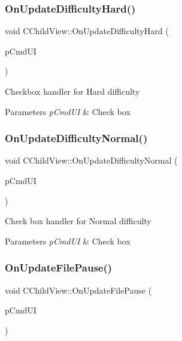 \subsubsection{\texorpdfstring{OnUpdateDifficultyHard()}{OnUpdateDifficultyHard()}}
{\footnotesize\ttfamily void C\+Child\+View\+::\+On\+Update\+Difficulty\+Hard (\begin{DoxyParamCaption}\item[{C\+Cmd\+UI $\ast$}]{p\+Cmd\+UI }\end{DoxyParamCaption})}

Checkbox handler for Hard difficulty 
\begin{DoxyParams}{Parameters}
{\em p\+Cmd\+UI} & Check box \\
\hline
\end{DoxyParams}
\mbox{\label{class_c_child_view_ac93835b94a1adc88c8e91d04e1ae0cb2}} 
\subsubsection{\texorpdfstring{OnUpdateDifficultyNormal()}{OnUpdateDifficultyNormal()}}
{\footnotesize\ttfamily void C\+Child\+View\+::\+On\+Update\+Difficulty\+Normal (\begin{DoxyParamCaption}\item[{C\+Cmd\+UI $\ast$}]{p\+Cmd\+UI }\end{DoxyParamCaption})}

Check box handler for Normal difficulty 
\begin{DoxyParams}{Parameters}
{\em p\+Cmd\+UI} & Check box \\
\hline
\end{DoxyParams}
\mbox{\label{class_c_child_view_a8aa93825b42eb316b550b11d7643c058}} 
\subsubsection{\texorpdfstring{OnUpdateFilePause()}{OnUpdateFilePause()}}
{\footnotesize\ttfamily void C\+Child\+View\+::\+On\+Update\+File\+Pause (\begin{DoxyParamCaption}\item[{C\+Cmd\+UI $\ast$}]{p\+Cmd\+UI }\end{DoxyParamCaption})}

